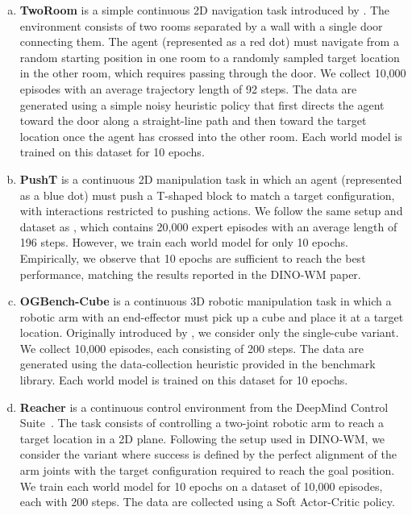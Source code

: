 \begin{enumerate}[a)]

\item \textbf{TwoRoom} is a simple continuous 2D navigation task introduced by \citet{sobal2025stresstesting}. The environment consists of two rooms separated by a wall with a single door connecting them. The agent (represented as a red dot) must navigate from a random starting position in one room to a randomly sampled target location in the other room, which requires passing through the door. We collect 10,000 episodes with an average trajectory length of 92 steps. The data are generated using a simple noisy heuristic policy that first directs the agent toward the door along a straight-line path and then toward the target location once the agent has crossed into the other room. Each world model is trained on this dataset for 10 epochs.

\item \textbf{PushT} is a continuous 2D manipulation task in which an agent (represented as a blue dot) must push a T-shaped block to match a target configuration, with interactions restricted to pushing actions. We follow the same setup and dataset as \citet{zhou2025dino-wm}, which contains 20,000 expert episodes with an average length of 196 steps. However, we train each world model for only 10 epochs. Empirically, we observe that 10 epochs are sufficient to reach the best performance, matching the results reported in the DINO-WM paper.

\item \textbf{OGBench-Cube} is a continuous 3D robotic manipulation task in which a robotic arm with an end-effector must pick up a cube and place it at a target location. Originally introduced by \citet{park2025ogbench}, we consider only the single-cube variant. We collect 10,000 episodes, each consisting of 200 steps. The data are generated using the data-collection heuristic provided in the benchmark library. Each world model is trained on this dataset for 10 epochs.

\item \textbf{Reacher} is a continuous control environment from the DeepMind Control Suite~\cite{tassa2018deepmind}. The task consists of controlling a two-joint robotic arm to reach a target location in a 2D plane. Following the setup used in DINO-WM, we consider the variant where success is defined by the perfect alignment of the arm joints with the target configuration required to reach the goal position. We train each world model for 10 epochs on a dataset of 10,000 episodes, each with 200 steps. The data are collected using a Soft Actor-Critic policy.

\end{enumerate}

